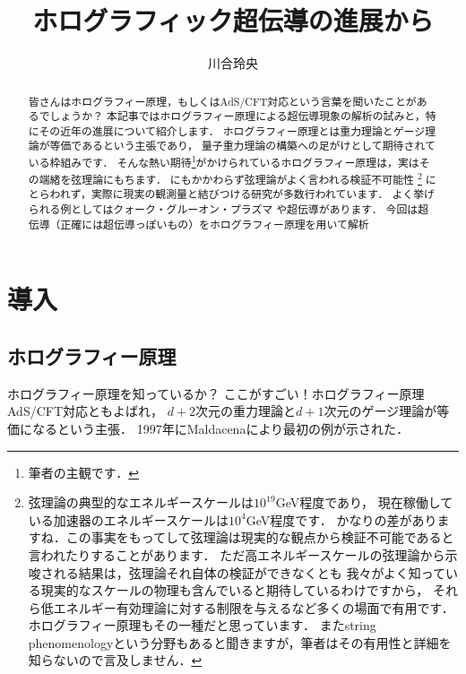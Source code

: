 \documentclass[b5paper,11pt,dvipdfmx]{jsarticle}
\numberwithin{equation}{section}
\theoremstyle{definition}
\begin{document}
\title{ホログラフィック超伝導の進展から}
\author{川合玲央}
\date{}

\maketitle


\begin{abstract}
    皆さんはホログラフィー原理，もしくはAdS/CFT対応という言葉を聞いたことがあるでしょうか？
    本記事ではホログラフィー原理による超伝導現象の解析の試みと，特にその近年の進展について紹介します．
    ホログラフィー原理とは重力理論とゲージ理論が等価であるという主張であり，
    量子重力理論の構築への足がけとして期待されている枠組みです．
    そんな熱い期待\footnote{筆者の主観です．}がかけられているホログラフィー原理は，実はその端緒を弦理論にもちます．
    にもかかわらず弦理論がよく言われる検証不可能性
\footnote{弦理論の典型的なエネルギースケールは$10^{19}$GeV程度であり，
現在稼働している加速器のエネルギースケールは$10^4$GeV程度です．
かなりの差がありますね．この事実をもってして弦理論は現実的な観点から検証不可能であると言われたりすることがあります．
ただ高エネルギースケールの弦理論から示唆される結果は，弦理論それ自体の検証ができなくとも
我々がよく知っている現実的なスケールの物理も含んでいると期待しているわけですから，
それら低エネルギー有効理論に対する制限を与えるなど多くの場面で有用です．
ホログラフィー原理もその一種だと思っています．
またstring phenomenologyという分野もあると聞きますが，筆者はその有用性と詳細を知らないので言及しません．}
にとらわれず，実際に現実の観測量と結びつける研究が多数行われています．
よく挙げられる例としてはクォーク・グルーオン・プラズマ\cite{Policastro01,Kovtun04}
や超伝導\cite{Hartnoll08a,Hartnoll08b}があります．
今回は超伝導（正確には超伝導っぽいもの）をホログラフィー原理を用いて解析
\end{abstract}


\section{導入}


\subsection{ホログラフィー原理}
ホログラフィー原理を知っているか？
ここがすごい！ホログラフィー原理
AdS/CFT対応ともよばれ，
$d + 2$次元の重力理論と$d + 1$次元のゲージ理論が等価になるという主張．
1997年にMaldacenaにより最初の例が示された\cite{Maldacena97}．
\end{document}
